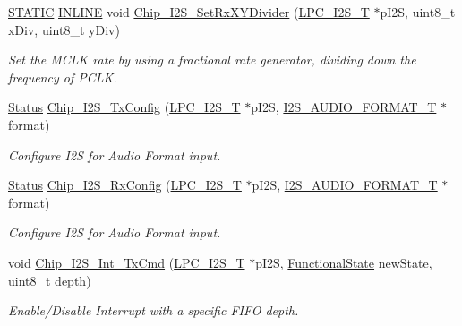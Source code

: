 \begin{DoxyCompactItemize}
\hyperlink{group___l_p_c___types___public___macros_ga10b2d890d871e1489bb02b7e70d9bdfb}{S\+T\+A\+T\+IC} \hyperlink{spifi__18xx__43xx_8h_a2eb6f9e0395b47b8d5e3eeae4fe0c116}{I\+N\+L\+I\+NE} void \hyperlink{group___i2_s__18_x_x__43_x_x_gafd2bc55fb29ea5f082d5ae3b5794f605}{Chip\+\_\+\+I2\+S\+\_\+\+Set\+Rx\+X\+Y\+Divider} (\hyperlink{struct_l_p_c___i2_s___t}{L\+P\+C\+\_\+\+I2\+S\+\_\+T} $\ast$p\+I2S, uint8\+\_\+t x\+Div, uint8\+\_\+t y\+Div)
\begin{DoxyCompactList}\small\item\em Set the M\+C\+LK rate by using a fractional rate generator, dividing down the frequency of P\+C\+LK. \end{DoxyCompactList}\item 
\hyperlink{group___l_p_c___types___public___types_ga67a0db04d321a74b7e7fcfd3f1a3f70b}{Status} \hyperlink{group___i2_s__18_x_x__43_x_x_ga09acfe336e9aee86f1d029146937326a}{Chip\+\_\+\+I2\+S\+\_\+\+Tx\+Config} (\hyperlink{struct_l_p_c___i2_s___t}{L\+P\+C\+\_\+\+I2\+S\+\_\+T} $\ast$p\+I2S, \hyperlink{struct_i2_s___a_u_d_i_o___f_o_r_m_a_t___t}{I2\+S\+\_\+\+A\+U\+D\+I\+O\+\_\+\+F\+O\+R\+M\+A\+T\+\_\+T} $\ast$format)
\begin{DoxyCompactList}\small\item\em Configure I2S for Audio Format input. \end{DoxyCompactList}\item 
\hyperlink{group___l_p_c___types___public___types_ga67a0db04d321a74b7e7fcfd3f1a3f70b}{Status} \hyperlink{group___i2_s__18_x_x__43_x_x_gab443fc12cad5f6cfb13dc5ab19a003ae}{Chip\+\_\+\+I2\+S\+\_\+\+Rx\+Config} (\hyperlink{struct_l_p_c___i2_s___t}{L\+P\+C\+\_\+\+I2\+S\+\_\+T} $\ast$p\+I2S, \hyperlink{struct_i2_s___a_u_d_i_o___f_o_r_m_a_t___t}{I2\+S\+\_\+\+A\+U\+D\+I\+O\+\_\+\+F\+O\+R\+M\+A\+T\+\_\+T} $\ast$format)
\begin{DoxyCompactList}\small\item\em Configure I2S for Audio Format input. \end{DoxyCompactList}\item 
void \hyperlink{group___i2_s__18_x_x__43_x_x_gaf5ea5a92372f64937b2a967f8aa284f3}{Chip\+\_\+\+I2\+S\+\_\+\+Int\+\_\+\+Tx\+Cmd} (\hyperlink{struct_l_p_c___i2_s___t}{L\+P\+C\+\_\+\+I2\+S\+\_\+T} $\ast$p\+I2S, \hyperlink{group___l_p_c___types___public___types_gac9a7e9a35d2513ec15c3b537aaa4fba1}{Functional\+State} new\+State, uint8\+\_\+t depth)
\begin{DoxyCompactList}\small\item\em Enable/\+Disable Interrupt with a specific F\+I\+FO depth. \end{DoxyCompactList}\item 

\end{DoxyCompactItemize}
